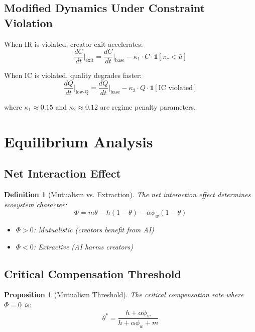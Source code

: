 \documentclass[11pt,a4paper]{article}
\newtheorem{definition}{Definition}
\newtheorem{proposition}{Proposition}
\begin{document}
\subsection{Modified Dynamics Under Constraint Violation}

When IR is violated, creator exit accelerates:
\begin{equation}
\frac{dC}{dt}\bigg|_{\text{exit}} = \frac{dC}{dt}\bigg|_{\text{base}} - \kappa_1 \cdot C \cdot \mathbb{1}[\pi_c < \bar{u}]
\end{equation}

When IC is violated, quality degrades faster:
\begin{equation}
\frac{dQ}{dt}\bigg|_{\text{low-Q}} = \frac{dQ}{dt}\bigg|_{\text{base}} - \kappa_2 \cdot Q \cdot \mathbb{1}[\text{IC violated}]
\end{equation}

where $\kappa_1 \approx 0.15$ and $\kappa_2 \approx 0.12$ are regime penalty parameters.

\section{Equilibrium Analysis}

\subsection{Net Interaction Effect}

\begin{definition}[Mutualism vs. Extraction]
The net interaction effect determines ecosystem character:
\begin{equation}
\Phi = m\theta - h(1-\theta) - \alpha\phi_w(1-\theta)
\end{equation}
\begin{itemize}
\item $\Phi > 0$: Mutualistic (creators benefit from AI)
\item $\Phi < 0$: Extractive (AI harms creators)
\end{itemize}
\end{definition}

\subsection{Critical Compensation Threshold}

\begin{proposition}[Mutualism Threshold]
The critical compensation rate where $\Phi = 0$ is:
\begin{equation}
\boxed{
\theta^* = \frac{h + \alpha\phi_w}{h + \alpha\phi_w + m}
}
\end{equation}
\end{proposition}
\end{document}
